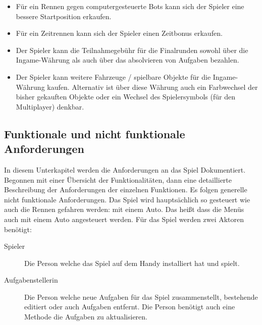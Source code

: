 \begin{enumerate}
		\begin{itemize}
			\item{Für ein Rennen gegen computergesteuerte Bots kann sich der Spieler eine bessere Startposition erkaufen.}
			\item{Für ein Zeitrennen kann sich der Spieler einen Zeitbonus erkaufen.}
			\item{Der Spieler kann die Teilnahmegebühr für die Finalrunden sowohl über die Ingame-Währung als auch über das absolvieren von Aufgaben bezahlen.}
			\item{Der Spieler kann weitere Fahrzeuge / spielbare Objekte für die Ingame-Währung kaufen. Alternativ ist über diese Währung auch ein Farbwechsel der bisher gekauften Objekte oder ein Wechsel des Spielersymbols (für den Multiplayer) denkbar.}
		\end{itemize}
	\end{enumerate}

\subsection{Funktionale und nicht funktionale Anforderungen}
	In diesem Unterkapitel werden die Anforderungen an das Spiel Dokumentiert. Begonnen mit einer Übersicht der Funktionalitäten, dann eine detaillierte Beschreibung der Anforderungen der einzelnen Funktionen. Es folgen generelle nicht funktionale Anforderungen.
	Das Spiel wird hauptsächlich so gesteuert wie auch die Rennen gefahren werden: mit einem Auto. Das heißt dass die Menüs auch mit einem Auto angesteuert werden.
	Für das Spiel werden zwei Aktoren benötigt:
	\begin{description}
		\item[Spieler]{ Die Person welche das Spiel auf dem Handy installiert hat und spielt. }
		\item[Aufgabenstellerin]{ Die Person welche neue Aufgaben für das Spiel zusammenstellt, bestehende editiert oder auch Aufgaben entfernt. Die Person benötigt auch eine Methode die Aufgaben zu aktualisieren. }
	\end{description}

